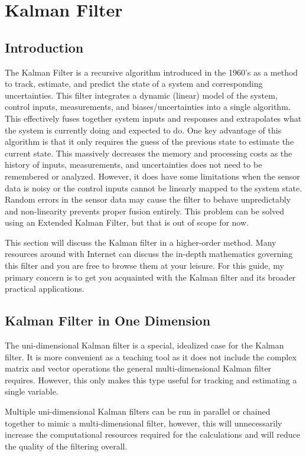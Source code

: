 \chapter{Kalman Filter} 
\section{Introduction} 
The Kalman Filter is a recursive algorithm introduced in the 1960's as a method to track, estimate, and predict the state of a system and corresponding uncertainties.
This filter integrates a dynamic (linear) model of the system, control inputs, measurements, and biases/uncertainties into a single algorithm.
This effectively fuses together system inputs and responses and extrapolates what the system is currently doing and expected to do.
One key advantage of this algorithm is that it only requires the guess of the previous state to estimate the current state. 
This massively decreases the memory and processing costs as the history of inputs, measurements, and uncertainties does not need to be remembered or analyzed.
However, it does have some limitations when the sensor data is noisy or the control inputs cannot be linearly mapped to the system state.
Random errors in the sensor data may cause the filter to behave unpredictably and non-linearity prevents proper fusion entirely.
This problem can be solved using an Extended Kalman Filter, but that is out of scope for now.

This section will discuss the Kalman filter in a higher-order method.
Many resources around with Internet can discuss the in-depth mathematics governing this filter and you are free to browse them at your leisure. 
For this guide, my primary concern is to get you acquainted with the Kalman filter and its broader practical applications.

\section{Kalman Filter in One Dimension}
The uni-dimensional Kalman filter is a special, idealized case for the Kalman filter.
It is more convenient as a teaching tool as it does not include the complex matrix and vector operations the general multi-dimensional Kalman filter requires.
However, this only makes this type useful for tracking and estimating a single variable.

Multiple uni-dimensional Kalman filters can be run in parallel or chained together to mimic a multi-dimensional filter, however, this will unnecessarily increase the computational resources required for the calculations and will reduce the quality of the filtering overall.


